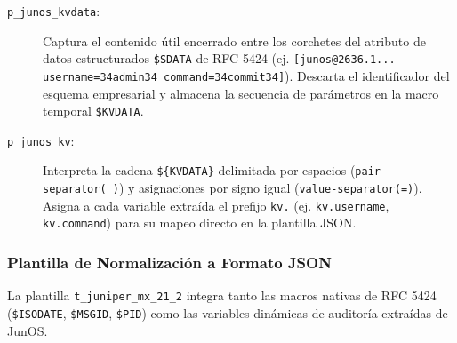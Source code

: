 \begin{description}
    \item[\texttt{p\_junos\_kvdata}:] Captura el contenido útil encerrado entre los corchetes del atributo de datos estructurados \texttt{\${SDATA}} de RFC 5424 (ej. \texttt{[junos@2636.1... username={34}admin{34} command={34}commit{34}]}). Descarta el identificador del esquema empresarial y almacena la secuencia de parámetros en la macro temporal \texttt{\${KVDATA}}.
    
    \item[\texttt{p\_junos\_kv}:] Interpreta la cadena \texttt{\$\{KVDATA\}} delimitada por espacios (\texttt{pair-separator(\ )}) y asignaciones por signo igual (\texttt{value-separator(=)}). Asigna a cada variable extraída el prefijo \texttt{kv.} (ej. \texttt{kv.username}, \texttt{kv.command}) para su mapeo directo en la plantilla JSON.
\end{description}

\subsubsection{Plantilla de Normalización a Formato JSON}

La plantilla \texttt{t\_juniper\_mx\_21\_2} integra tanto las macros nativas de RFC 5424 (\texttt{\${ISODATE}}, \texttt{\${MSGID}}, \texttt{\${PID}}) como las variables dinámicas de auditoría extraídas de JunOS.

